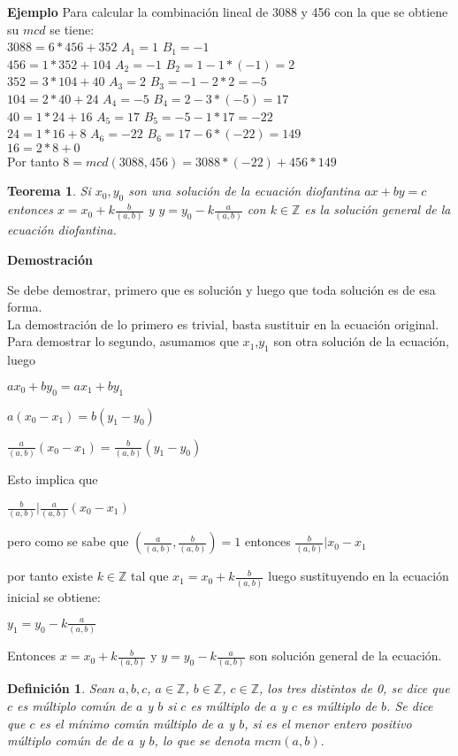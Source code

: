 \documentclass[a4paper,1pt]{report}
\newtheorem*{teo}{Teorema}
\newtheorem*{dfn}{Definición}
\begin{document}
\textbf{Ejemplo}
Para calcular la combinación lineal de 3088 y 456 con la que se obtiene su $mcd$ se tiene:\\
$3088=6*456+352$ $A_1=1$ $B_1=-1$\\
$456=1*352+104$ $A_2=-1$ $B_2=1-1*(-1)=2$\\
$352=3*104+40$ $A_3=2$ $B_3=-1-2*2=-5$\\
$104=2*40+24$ $A_4=-5$ $B_4=2-3*(-5)=17$\\
$40=1*24+16$ $A_5=17$ $B_5=-5-1*17=-22$\\
$24=1*16+8$ $A_6=-22$ $B_6=17-6*(-22)=149$\\
$16=2*8 + 0$\\
Por tanto $8=mcd(3088,456)=3088*(-22)+456*149$

\begin{teo}
 Si $x_0,y_0$ son una solución de la ecuación diofantina $ax+by=c$ entonces 
 $x=x_0+k\frac{b}{(a,b)}$ y $y=y_0-k\frac{a}{(a,b)}$ con $k\in\mathbb{Z}$ es la solución general de la ecuación diofantina.
\end{teo}

\newpage
\textbf{Demostración}

Se debe demostrar, primero que es solución y luego que toda solución es de esa forma.
\\

La demostración de lo primero es trivial, basta sustituir en la ecuación original.
\\

Para demostrar lo segundo, asumamos que $x_1$,$y_1$ son otra solución de la ecuación, luego

$ax_0+by_0=ax_1+by_1$

$a(x_0-x_1)=b(y_1-y_0)$

$\frac{a}{(a,b)}(x_0-x_1)=\frac{b}{(a,b)}(y_1-y_0)$

Esto implica que

$\frac{b}{(a,b)}|\frac{a}{(a,b)}(x_0-x_1)$

pero como se sabe que $(\frac{a}{(a,b)},\frac{b}{(a,b)})=1$ entonces $\frac{b}{(a,b)}|x_0-x_1$

por tanto existe $k\in\mathbb{Z}$ tal que $x_1=x_0 + k\frac{b}{(a,b)}$ luego sustituyendo en la ecuación inicial se obtiene:

$y_1=y_0-k\frac{a}{(a,b)}$

Entonces $x=x_0+k\frac{b}{(a,b)}$ y $y=y_0-k\frac{a}{(a,b)}$ son solución general de la ecuación.

\begin{dfn}
 Sean $a,b,c$, $a\in\mathbb{Z}$, $b\in\mathbb{Z}$, $c\in\mathbb{Z}$, los tres distintos de 0, se dice que $c$ es múltiplo común de $a$ y $b$ si $c$ es múltiplo de $a$ y $c$ es múltiplo de $b$. Se dice que $c$ es el mínimo común múltiplo de $a$ y $b$, si es el menor entero positivo múltiplo común de de $a$ y $b$, lo que se denota $mcm(a,b)$.
\end{dfn}
\end{document}
